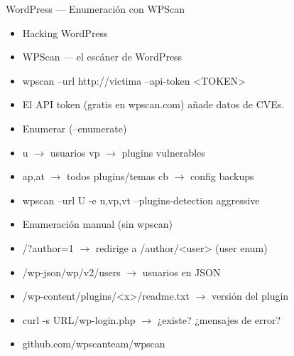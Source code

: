 \documentclass[aspectratio=169,10pt]{beamer}
\begin{document}
\begin{frame}[allowframebreaks]{WordPress --- Enumeración con WPScan}
\small
  \begin{itemize}
  \item Hacking WordPress
  \item WPScan --- el escáner de WordPress
  \item wpscan --url http://victima --api-token \textless{}TOKEN\textgreater{}
  \item El API token (gratis en wpscan.com) añade datos de CVEs.
  \item Enumerar (--enumerate)
  \item u $\rightarrow$ usuarios vp $\rightarrow$ plugins vulnerables
  \item ap,at $\rightarrow$ todos plugins/temas cb $\rightarrow$ config backups
  \item wpscan --url U -e u,vp,vt --plugins-detection aggressive
  \item Enumeración manual (sin wpscan)
  \item /?author=1 $\rightarrow$ redirige a /author/\textless{}user\textgreater{} (user enum)
  \item /wp-json/wp/v2/users $\rightarrow$ usuarios en JSON
  \item /wp-content/plugins/\textless{}x\textgreater{}/readme.txt $\rightarrow$ versión del plugin
  \item curl -s URL/wp-login.php $\rightarrow$ ¿existe? ¿mensajes de error?
  \item github.com/wpscanteam/wpscan
  \end{itemize}
\end{frame}
\end{document}
